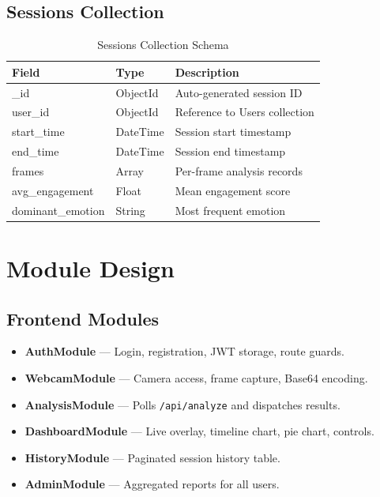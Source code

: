 \subsection{Sessions Collection}

\begin{table}[H]
\centering
\caption{Sessions Collection Schema}
\begin{tabular}{lll}
\toprule
\textbf{Field}    & \textbf{Type} & \textbf{Description} \\
\midrule
\_id              & ObjectId  & Auto-generated session ID \\
user\_id          & ObjectId  & Reference to Users collection \\
start\_time       & DateTime  & Session start timestamp \\
end\_time         & DateTime  & Session end timestamp \\
frames            & Array     & Per-frame analysis records \\
avg\_engagement   & Float     & Mean engagement score \\
dominant\_emotion & String    & Most frequent emotion \\
\bottomrule
\end{tabular}
\end{table}

\section{Module Design}

\subsection{Frontend Modules}
\begin{itemize}
    \item \textbf{AuthModule} — Login, registration, JWT storage, route guards.
    \item \textbf{WebcamModule} — Camera access, frame capture, Base64 encoding.
    \item \textbf{AnalysisModule} — Polls \texttt{/api/analyze} and dispatches results.
    \item \textbf{DashboardModule} — Live overlay, timeline chart, pie chart, controls.
    \item \textbf{HistoryModule} — Paginated session history table.
    \item \textbf{AdminModule} — Aggregated reports for all users.
\end{itemize}


